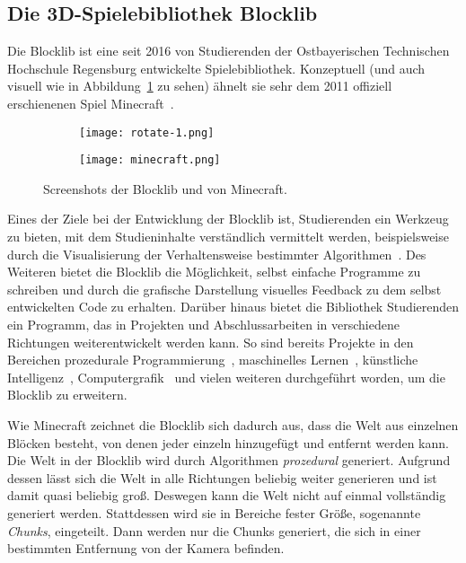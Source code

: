 \subsection{Die 3D-Spielebibliothek Blocklib}
Die Blocklib ist eine seit 2016 von Studierenden der Ostbayerischen Technischen Hochschule Regensburg entwickelte Spielebibliothek. Konzeptuell (und auch visuell wie in Abbildung~\ref{fig:blocklibminecraft} zu sehen) ähnelt sie sehr dem 2011 offiziell erschienenen Spiel Minecraft~\cite{Mojang}.
\begin{figure}[!htbp]
	\begin{subfigure}[b]{.49\textwidth}
		\texttt{[image: rotate-1.png]}
	\end{subfigure}
	\begin{subfigure}[b]{.49\textwidth}
		\texttt{[image: minecraft.png]}
	\end{subfigure}
	\caption{Screenshots der Blocklib und von Minecraft.}\label{fig:blocklibminecraft}
\end{figure}
Eines der Ziele bei der Entwicklung der Blocklib ist, Studierenden ein Werkzeug zu bieten, mit dem Studieninhalte verständlich vermittelt werden,  beispielsweise durch die Visualisierung der Verhaltensweise bestimmter Algorithmen~\cite{Helgert2018}. Des Weiteren bietet die Blocklib die Möglichkeit, selbst einfache Programme zu schreiben und durch die grafische Darstellung visuelles Feedback zu dem selbst entwickelten Code zu erhalten. Darüber hinaus bietet die Bibliothek Studierenden ein Programm, das in Projekten und Abschlussarbeiten in verschiedene Richtungen weiterentwickelt werden kann. So sind bereits Projekte in den Bereichen prozedurale Programmierung~\cite{Beer2017,Ebbinger2018a,Kalle2018,Sellner2020,Kohler2021}, maschinelles Lernen~\cite{Mayer2021}, künstliche Intelligenz~\cite{Amthor2017,Weidner2018,Bunke2021,Mayer2021}, Computergrafik~\cite{Zink2016,Ebbinger2018,Werner2018} und vielen weiteren durchgeführt worden, um die Blocklib zu erweitern.

Wie Minecraft zeichnet die Blocklib sich dadurch aus, dass die Welt aus einzelnen Blöcken besteht, von denen jeder einzeln hinzugefügt und entfernt werden kann. Die Welt in der Blocklib wird durch Algorithmen \emph{prozedural} generiert. Aufgrund dessen lässt sich die Welt in alle Richtungen beliebig weiter generieren und ist damit quasi beliebig groß. Deswegen kann die Welt nicht auf einmal vollständig generiert werden. Stattdessen wird sie in Bereiche fester Größe, sogenannte \emph{Chunks}, eingeteilt. Dann werden nur die Chunks generiert, die sich in einer bestimmten Entfernung von der Kamera befinden.


